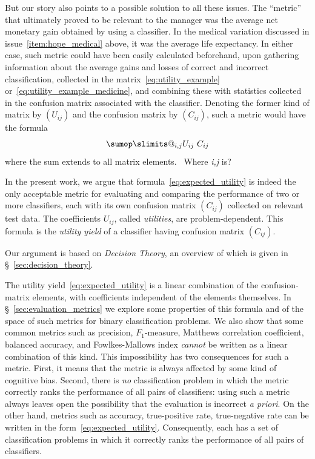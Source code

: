 \documentclass[\ifafour a4paper,12pt,\else a5paper,10pt,\fi%
onecolumn,oneside,article,%
british%
]{memoir}
\makeatletter
\theoremstyle{remark}
\theoremstyle{innote}
\def\sum{\DOTSI\sumop\slimits@}
\newcommand*{\wrench}{{\fontencoding{U}\fontfamily{fontawesomethree}\selectfont\symbol{114}}}
\newcommand{\mynotew}[1]{{\footnotesize\color{notecolour}\wrench\ #1}}
\renewcommand*{\|}[1][]{\nonscript\:#1\vert\nonscript\:\mathopen{}}
\newcommand*{\sect}{\S}%
\makeatother
\begin{document}
\bigskip

But our story also points to a possible solution to all these issues. The \enquote{metric} that ultimately proved to be relevant to the manager was the average net monetary gain obtained by using a classifier. In the medical variation discussed in issue~\ref{item:hope_medical} above, it was the average life expectancy.  In either case, such metric could have been easily calculated beforehand, upon gathering information about the average gains and losses of correct and incorrect classification, collected in the matrix~\eqref{eq:utility_example} or~\eqref{eq:utility_example_medicine}, and combining these with statistics collected in the confusion matrix associated with the classifier. Denoting the former kind of matrix by $(U_{ij})$ and the confusion matrix by $(C_{ij})$, such a metric would have the formula
\begin{equation}
  \label{eq:expected_utility}
  \sum_{i,j} U_{ij}\ C_{ij} 
\end{equation}
where the sum extends to all matrix elements. \mynotew{Where \emph{i,j} is?}

\medskip

In the present work, we argue that formula~\eqref{eq:expected_utility} is indeed the only acceptable metric for evaluating and comparing the performance of two or more classifiers, each with its own confusion matrix $(C_{ij})$ collected on relevant test data. The coefficients $U_{ij}$, called \emph{utilities}, are problem-dependent. This formula is the \emph{utility yield} of a classifier having confusion matrix $(C_{ij})$.

Our argument is based on \emph{Decision Theory}, an overview of which is given in \sect~\ref{sec:decision_theory}.

The utility yield~\eqref{eq:expected_utility} is a linear combination of the confusion-matrix elements, with coefficients independent of the elements themselves. In \sect~\ref{sec:evaluation_metrics} we explore some properties of this formula and of the space of such metrics for binary classification problems. We also show that some common metrics such as precision, $F_{1}$-measure, Matthews correlation coefficient, balanced accuracy, and Fowlkes-Mallows index \emph{cannot} be written as a linear combination of this kind. This impossibility has two consequences for such a metric. First, it means that the metric is always affected by some kind of cognitive bias. Second, there is \emph{no} classification problem in which the metric correctly ranks the performance of all pairs of classifiers: using such a metric always leaves open the possibility that the evaluation is incorrect \emph{a priori}. On the other hand, metrics such as accuracy, true-positive rate, true-negative rate can be written in the form~\eqref{eq:expected_utility}. Consequently, each has a set of classification problems in which it correctly ranks the performance of all pairs of classifiers.
\end{document}
